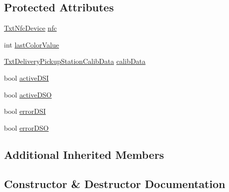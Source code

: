 \subsection*{Protected Attributes}
\begin{DoxyCompactItemize}
\item 
\hyperlink{classft_1_1_txt_nfc_device}{Txt\+Nfc\+Device} \hyperlink{classft_1_1_txt_delivery_pickup_station_aae2ad74dead3d9f529b65b6e3d63c046}{nfc}
\item 
int \hyperlink{classft_1_1_txt_delivery_pickup_station_a863efee2bbf6d77ac83118f8f6dcee74}{last\+Color\+Value}
\item 
\hyperlink{classft_1_1_txt_delivery_pickup_station_calib_data}{Txt\+Delivery\+Pickup\+Station\+Calib\+Data} \hyperlink{classft_1_1_txt_delivery_pickup_station_a6e032ed26b1061e6aea8d85e1f7f364c}{calib\+Data}
\item 
bool \hyperlink{classft_1_1_txt_delivery_pickup_station_ad70d7c1332c6bf85c45f66604b7d2634}{active\+D\+SI}
\item 
bool \hyperlink{classft_1_1_txt_delivery_pickup_station_a90bb70c5a14c9268ed44259db1d4aa3a}{active\+D\+SO}
\item 
bool \hyperlink{classft_1_1_txt_delivery_pickup_station_aa20a39e2608a15cee84db79474188a31}{error\+D\+SI}
\item 
bool \hyperlink{classft_1_1_txt_delivery_pickup_station_a9bf2ca8edc321673306d3853985cb4e2}{error\+D\+SO}
\end{DoxyCompactItemize}
\subsection*{Additional Inherited Members}


\subsection{Constructor \& Destructor Documentation}
